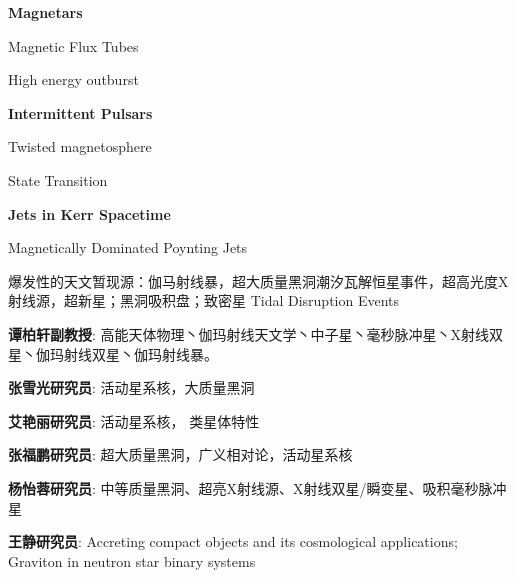 \documentclass[CJK]{beamer}
\begin{document}
\begin{frame}
  \bch
        {\bf Magnetars}

        Magnetic Flux Tubes

        High energy outburst

        \skiplines
        
        {\bf Intermittent Pulsars}

        Twisted magnetosphere

        State Transition

        \skiplines
        
        {\bf Jets in Kerr Spacetime}

        Magnetically Dominated Poynting Jets
  
  
  \emini

  \skipline


  \skipline

  \emini
  \ech
\end{frame}

\begin{frame}
  \bch
  
  
  爆发性的天文暂现源：伽马射线暴，超大质量黑洞潮汐瓦解恒星事件，超高光度X射线源，超新星；黑洞吸积盘；致密星
  \emini
  \bcenter
  Tidal Disruption Events

  \ecenter
  \emini
  \ech
\end{frame}

\begin{frame}
  \bch
  \bitem
\item{{\bf 谭柏轩副教授}: 高能天体物理丶伽玛射线天文学丶中子星丶毫秒脉冲星丶X射线双星丶伽玛射线双星丶伽玛射线暴。}
\item{{\bf 张雪光研究员}: 活动星系核，大质量黑洞}
\item{{\bf 艾艳丽研究员}: 活动星系核， 类星体特性  }  
\item{{\bf 张福鹏研究员}: 超大质量黑洞，广义相对论，活动星系核}  
\item{{\bf 杨怡蓉研究员}: 中等质量黑洞、超亮X射线源、X射线双星/瞬变星、吸积毫秒脉冲星 }
\item{{\bf 王静研究员}: Accreting compact objects and its cosmological applications; Graviton in neutron star binary systems}
  \eitem
  \ech
\end{frame}
\end{document}
